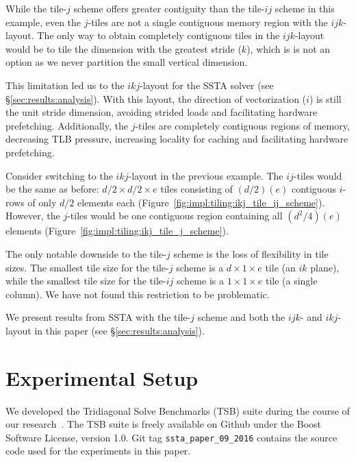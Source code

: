 \documentclass[10pt, conference, compsocconf]{IEEEtran}
\begin{document}
While the tile-\(j\) scheme offers greater contiguity than the tile-\(ij\)
  scheme in this example, even the \(j\)-tiles are not a single
  contiguous memory region with the \(ijk\)-layout.
The only way to obtain completely contiguous tiles in the \(ijk\)-layout would
  be to tile the dimension with the greatest stride (\(k\)), which is is not an
  option as we never partition the small vertical dimension.

This limitation led us to the \(ikj\)-layout for the SSTA solver (see
  \S\ref{sec:results:analysis}).
With this layout, the direction of vectorization (\(i\)) is still the unit stride
  dimension, avoiding strided loads and facilitating hardware prefetching.
Additionally, the \(j\)-tiles are completely contiguous regions of memory,
  decreasing TLB pressure, increasing locality for caching and facilitating
  hardware prefetching.

Consider switching to the \(ikj\)-layout in the previous example.
The \(ij\)-tiles would be the same as before:
  \(d/2 \times d/2 \times e\) tiles consisting of \((d/2)(e)\) contiguous
  \(i\)-rows of only \(d/2\) elements each
  (Figure~\ref{fig:impl:tiling:ikj_tile_ij_scheme}).
However, the \(j\)-tiles would be one contiguous region containing all
  \((d^2/4)(e)\) elements
  (Figure~\ref{fig:impl:tiling:ikj_tile_j_scheme}).

The only notable downside to the tile-\(j\) scheme is the loss of
  flexibility in tile sizes.
The smallest tile size for the tile-\(j\) scheme is a \(d \times 1 \times e\)
  tile (an \(ik\) plane), while the smallest tile size for the
  tile-\(ij\) scheme is a \(1 \times 1 \times e\) tile (a single column).
We have not found this restriction to be problematic.

We present results from SSTA with the tile-\(j\) scheme and both the \(ijk\)-
  and \(ikj\)-layout in this paper (see \S\ref{sec:results:analysis}).

\section{Experimental Setup}
\label{sec:setup}
We developed the Tridiagonal Solve Benchmarks (TSB) suite during the course of
  our research~\cite{tsb_git}.
The TSB suite is freely available on Github under the Boost Software License,
  version 1.0.
Git tag \lstinline{ssta_paper_09_2016} contains the source code used for the
  experiments in this paper.
\end{document}
